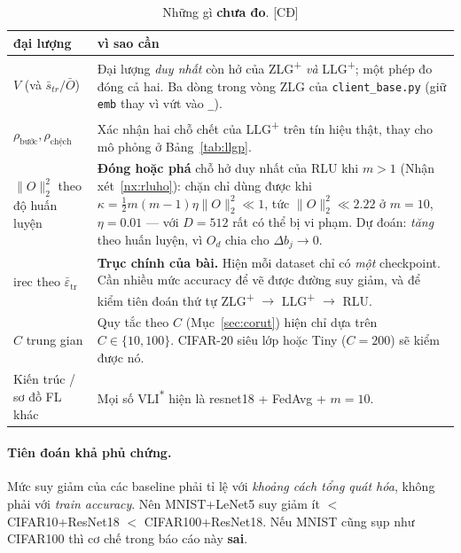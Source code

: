 \documentclass[11pt,a4paper]{article}
\theoremstyle{remark}
\newcommand{\epstr}{\bar\varepsilon_{\mathrm{tr}}}
\newcommand{\code}[1]{\texttt{\small #1}}
\newcommand{\CD}{\textsf{[CĐ]}}
\begin{document}
\begin{table}[htbp]
\centering
\caption{Những gì \textbf{chưa đo}. \CD}
\label{tab:chuado}
\small
\begin{tabular}{@{}p{3.4cm}p{11.4cm}@{}}
\toprule
\textbf{đại lượng} & \textbf{vì sao cần} \\
\midrule
$V$ (và $\bar s_{tr}/\bar O$)
  & Đại lượng \emph{duy nhất} còn hở của ZLG\textsuperscript{+} \emph{và}
    LLG\textsuperscript{+}; một phép đo đóng cả hai. Ba dòng trong vòng ZLG của
    \code{client\_base.py} (giữ \code{emb} thay vì vứt vào \code{\_}). \\
$\rho_{\text{bước}},\rho_{\text{chệch}}$
  & Xác nhận hai chỗ chết của LLG\textsuperscript{+} trên tín hiệu thật, thay
    cho mô phỏng ở Bảng~\ref{tab:llgp}. \\
$\|O\|_2^2$ theo độ huấn luyện
  & \textbf{Đóng hoặc phá} chỗ hở duy nhất của RLU khi $m>1$
    (Nhận xét~\ref{nx:rluho}): chặn chỉ dùng được khi
    $\kappa=\frac12 m(m{-}1)\eta\|O\|_2^2\ll1$, tức $\|O\|_2^2\ll2.22$ ở
    $m{=}10$, $\eta{=}0.01$ --- với $D{=}512$ rất có thể bị vi phạm. Dự đoán:
    \emph{tăng} theo huấn luyện, vì $O_d$ chia cho $\Delta b_j\to0$. \\
irec theo $\epstr$
  & \textbf{Trục chính của bài.} Hiện mỗi dataset chỉ có \emph{một} checkpoint.
    Cần nhiều mức accuracy để vẽ được đường suy giảm, và để kiểm tiên đoán thứ
    tự ZLG\textsuperscript{+} $\to$ LLG\textsuperscript{+} $\to$ RLU. \\
$C$ trung gian
  & Quy tắc theo $C$ (Mục~\ref{sec:corut}) hiện chỉ dựa trên $C\in\{10,100\}$.
    CIFAR-20 siêu lớp hoặc Tiny ($C{=}200$) sẽ kiểm được nó. \\
Kiến trúc / sơ đồ FL khác
  & Mọi số VLI\textsuperscript{$*$} hiện là resnet18 + FedAvg + $m{=}10$. \\
\bottomrule
\end{tabular}
\end{table}

\paragraph{Tiên đoán khả phủ chứng.} Mức suy giảm của các baseline phải tỉ lệ
với \emph{khoảng cách tổng quát hóa}, không phải với \emph{train accuracy}. Nên
MNIST+LeNet5 suy giảm ít $<$ CIFAR10+ResNet18 $<$ CIFAR100+ResNet18. Nếu MNIST
cũng sụp như CIFAR100 thì cơ chế trong báo cáo này \textbf{sai}.

\appendix
\end{document}
